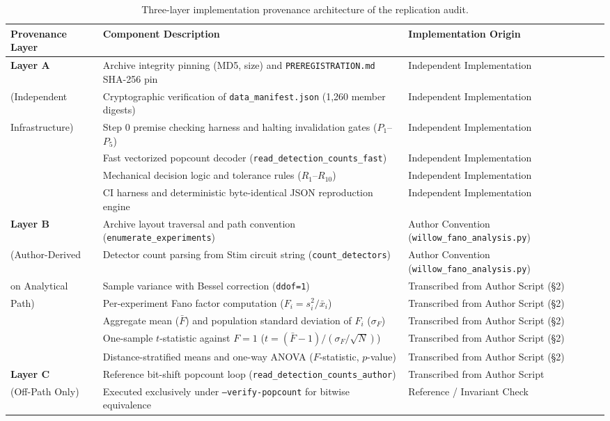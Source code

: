 \begin{table}[htbp]
\centering
\footnotesize
\setlength{\tabcolsep}{3pt}
\begin{tabularx}{\linewidth}{|l|X|l|}
\hline
\textbf{Provenance Layer} & \textbf{Component Description} & \textbf{Implementation Origin} \\
\hline
\textbf{Layer A} & Archive integrity pinning (MD5, size) and \texttt{PREREGISTRATION.md} SHA-256 pin & Independent Implementation \\
(Independent & Cryptographic verification of \texttt{data\_manifest.json} (1,260 member digests) & Independent Implementation \\
Infrastructure) & Step 0 premise checking harness and halting invalidation gates ($P_1$–$P_5$) & Independent Implementation \\
& Fast vectorized popcount decoder (\texttt{read\_detection\_counts\_fast}) & Independent Implementation \\
& Mechanical decision logic and tolerance rules ($R_1$–$R_{10}$) & Independent Implementation \\
& CI harness and deterministic byte-identical JSON reproduction engine & Independent Implementation \\
\hline
\textbf{Layer B} & Archive layout traversal and path convention (\texttt{enumerate\_experiments}) & Author Convention (\texttt{willow\_fano\_analysis.py}) \\
(Author-Derived & Detector count parsing from Stim circuit string (\texttt{count\_detectors}) & Author Convention (\texttt{willow\_fano\_analysis.py}) \\
on Analytical & Sample variance with Bessel correction (\texttt{ddof=1}) & Transcribed from Author Script (§2) \\
Path) & Per-experiment Fano factor computation ($F_i = s_i^2 / \bar{x}_i$) & Transcribed from Author Script (§2) \\
& Aggregate mean ($\bar{F}$) and population standard deviation of $F_i$ ($\sigma_F$) & Transcribed from Author Script (§2) \\
& One-sample $t$-statistic against $F=1$ ($t = (\bar{F} - 1) / (\sigma_F / \sqrt{N})$) & Transcribed from Author Script (§2) \\
& Distance-stratified means and one-way ANOVA ($F$-statistic, $p$-value) & Transcribed from Author Script (§2) \\
\hline
\textbf{Layer C} & Reference bit-shift popcount loop (\texttt{read\_detection\_counts\_author}) & Transcribed from Author Script \\
(Off-Path Only) & Executed exclusively under \texttt{--verify-popcount} for bitwise equivalence & Reference / Invariant Check \\
\hline
\end{tabularx}
\caption{Three-layer implementation provenance architecture of the replication audit.}
\label{tab:provenance}
\end{table}

